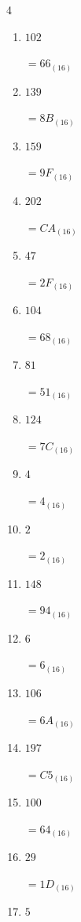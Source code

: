 \begin{multicols}{4}
\begin{enumerate}
  \item $102$

        $=66_{(16)}$

  \item $139$

        $=8B_{(16)}$

  \item $159$

        $=9F_{(16)}$

  \item $202$

        $=CA_{(16)}$

  \item $47$

        $=2F_{(16)}$

  \item $104$

        $=68_{(16)}$

  \item $81$

        $=51_{(16)}$

\columnbreak %

  \item $124$

        $=7C_{(16)}$

  \item $4$

        $=4_{(16)}$

  \item $2$

        $=2_{(16)}$

  \item $148$

        $=94_{(16)}$

  \item $6$

        $=6_{(16)}$

  \item $106$

        $=6A_{(16)}$

  \item $197$

        $=C5_{(16)}$

  \item $100$

        $=64_{(16)}$

  \item $29$

        $=1D_{(16)}$

  \item $5$


\end{enumerate}
\end{multicols}
